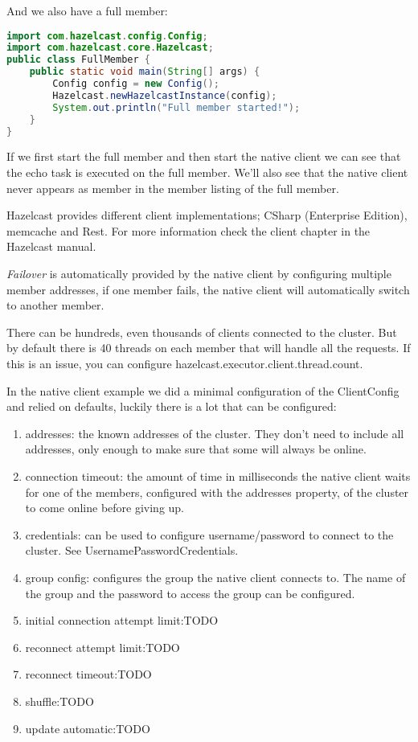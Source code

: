 And we also have a full member:
\begin{lstlisting}[language=java]
import com.hazelcast.config.Config;
import com.hazelcast.core.Hazelcast;
public class FullMember {
    public static void main(String[] args) {
        Config config = new Config();
        Hazelcast.newHazelcastInstance(config);
        System.out.println("Full member started!");
    }
}
\end{lstlisting}
If we first start the full member and then start the native client we can see that the echo task is executed on the full member. We'll also see that the native client never appears as member in the member listing of the full member.
 
Hazelcast provides different client implementations; CSharp (Enterprise Edition), memcache and Rest. For more information check the client chapter in the Hazelcast manual.

\emph{Failover} is automatically provided by the native client by configuring multiple member addresses, if one member fails, the native client will automatically switch to another member.

There can be hundreds, even thousands of clients connected to the cluster. But by default there is 40 threads on each member that will handle all the requests. If this is an issue, you can configure hazelcast.executor.client.thread.count.

In the native client example we did a minimal configuration of the ClientConfig and relied on defaults, luckily there is a lot that can be configured:
\begin{enumerate}
\item addresses: the known addresses of the cluster. They don't need to include all addresses, only enough to make sure that some will always be online.
\item connection timeout: the amount of time in milliseconds the native client waits for one of the members, configured with the addresses property, of the cluster to come online before giving up.
\item credentials: can be used to configure username/password to connect to the cluster. See UsernamePasswordCredentials.
\item group config: configures the group the native client connects to. The name of the group and the password to access the group can be configured.
\item initial connection attempt limit:TODO
\item reconnect attempt limit:TODO
\item reconnect timeout:TODO
\item shuffle:TODO
\item update automatic:TODO
\end{enumerate}

